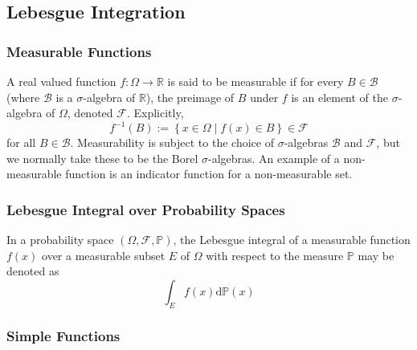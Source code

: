 \documentclass[11pt]{report} %
\begin{document}
\subsection{Lebesgue Integration}

\subsubsection{Measurable Functions}

A real valued function $f: \Omega \to \mathbb{R}$ is said to be measurable if for every $B\in\mathcal{B}$ (where $\mathcal{B}$ is a $\sigma$-algebra of $\mathbb{R}$), the preimage of $B$ under $f$ is an element of the $\sigma$-algebra of $\Omega$, denoted $\mathcal{F}$. Explicitly,
\begin{equation}
f^{-1}\left(B\right) := \left\{x \in \Omega \middle| f\left(x\right) \in B\right\} \in \mathcal{F}
\end{equation}
for all $B \in\mathcal{B}$. Measurability is subject to the choice of $\sigma$-algebras $\mathcal{B}$ and $\mathcal{F}$, but we normally take these to be the Borel $\sigma$-algebras. An example of a non-measurable function is an indicator function for a non-measurable set.

\subsubsection{Lebesgue Integral over Probability Spaces}

In a probability space $\left(\Omega, \mathcal{F}, \mathbb{P}\right)$, the Lebesgue integral of a measurable function $f\left(x\right)$ over a measurable subset $E$ of $\Omega$ with respect to the measure $\mathbb{P}$ may be denoted as
\begin{equation}
\int_{E}f\left(x\right)\mathrm{d}\mathbb{P}\left(x\right)
\end{equation}

\subsubsection{Simple Functions}
\end{document}
